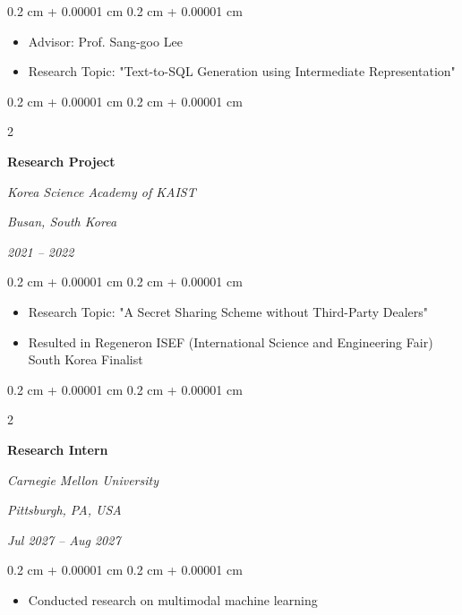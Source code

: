 \documentclass[10pt, letterpaper]{article}
\newenvironment{highlights}{
    \begin{itemize}[
        topsep=0.10 cm,
        parsep=0.10 cm,
        partopsep=0pt,
        itemsep=0pt,
        leftmargin=0.4 cm + 10pt
    ]
}{
    \end{itemize}
} %
\newenvironment{onecolentry}{
    \begin{adjustwidth}{
        0.2 cm + 0.00001 cm
    }{
        0.2 cm + 0.00001 cm
    }
}{
    \end{adjustwidth}
} %
\newenvironment{twocolentry}[2][]{
    \onecolentry
    \def\secondColumn{#2}
    \setcolumnwidth{\fill, 4.5 cm}
    \begin{paracol}{2}
}{
    \switchcolumn \raggedleft \secondColumn
    \end{paracol}
    \endonecolentry
} %
\begin{document}
        \vspace{0.10 cm}
        \begin{onecolentry}
            \begin{highlights}
                \item Advisor: Prof. Sang-goo Lee
                \item Research Topic: "Text-to-SQL Generation using Intermediate Representation"
            \end{highlights}
        \end{onecolentry}

        \vspace{0.2 cm}

        \begin{twocolentry}{
        \textit{Busan, South Korea}    
            
        \textit{2021 – 2022}}
            \textbf{Research Project}
            
            \textit{Korea Science Academy of KAIST}
        \end{twocolentry}

        \vspace{0.10 cm}
        \begin{onecolentry}
            \begin{highlights}
                \item Research Topic: "A Secret Sharing Scheme without Third-Party Dealers"
                \item Resulted in Regeneron ISEF (International Science and Engineering Fair) South Korea Finalist
            \end{highlights}
        \end{onecolentry}

        \begin{twocolentry}{
        \textit{Pittsburgh, PA, USA}    
            
        \textit{Jul 2027 – Aug 2027}}
            \textbf{Research Intern}
            
            \textit{Carnegie Mellon University}
        \end{twocolentry}

        \vspace{0.10 cm}
        \begin{onecolentry}
            \begin{highlights}
                \item Conducted research on multimodal machine learning
            \end{highlights}
        \end{onecolentry}
\end{document}
